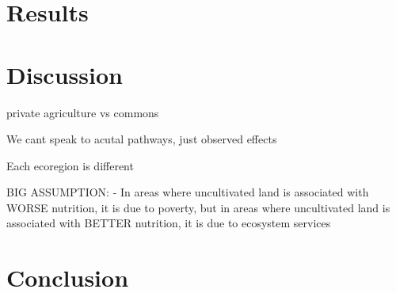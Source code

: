 \documentclass{article}
\begin{document}
\section{Results}


\section{Discussion}

private agriculture vs commons

We cant speak to acutal pathways, just observed effects

Each ecoregion is different

BIG ASSUMPTION:
 - In areas where uncultivated land is associated with WORSE nutrition, it is due to poverty, but in areas where uncultivated land is associated with BETTER nutrition, it is due to ecosystem services

\section{Conclusion}




\end{document}
